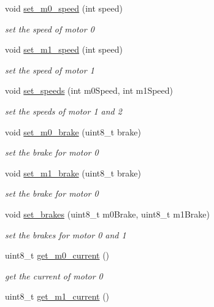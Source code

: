 \begin{DoxyCompactItemize}
\item 
void \hyperlink{class_qik_a6dc1b476ef343bdc6def0f6fd548002a}{set\+\_\+m0\+\_\+speed} (int speed)
\begin{DoxyCompactList}\small\item\em set the speed of motor 0 \end{DoxyCompactList}\item 
void \hyperlink{class_qik_a0973688f7c423dff7cfaa26dab91a126}{set\+\_\+m1\+\_\+speed} (int speed)
\begin{DoxyCompactList}\small\item\em set the speed of motor 1 \end{DoxyCompactList}\item 
void \hyperlink{class_qik_a6d504c59e7eec46da40ad9e71199b6ff}{set\+\_\+speeds} (int m0\+Speed, int m1\+Speed)
\begin{DoxyCompactList}\small\item\em set the speeds of motor 1 and 2 \end{DoxyCompactList}\item 
void \hyperlink{class_qik_a2b2195033a0459df0daec4a01898811a}{set\+\_\+m0\+\_\+brake} (uint8\+\_\+t brake)
\begin{DoxyCompactList}\small\item\em set the brake for motor 0 \end{DoxyCompactList}\item 
void \hyperlink{class_qik_a1795a6acae6aa0f9be0784ff408e5225}{set\+\_\+m1\+\_\+brake} (uint8\+\_\+t brake)
\begin{DoxyCompactList}\small\item\em set the brake for motor 0 \end{DoxyCompactList}\item 
void \hyperlink{class_qik_a0c6762eb5ffe8eaaa12407126caf568c}{set\+\_\+brakes} (uint8\+\_\+t m0\+Brake, uint8\+\_\+t m1\+Brake)
\begin{DoxyCompactList}\small\item\em set the brakes for motor 0 and 1 \end{DoxyCompactList}\item 
uint8\+\_\+t \hyperlink{class_qik_a73e1dfec2256dbe5d8ba2147501bf7d9}{get\+\_\+m0\+\_\+current} ()
\begin{DoxyCompactList}\small\item\em get the current of motor 0 \end{DoxyCompactList}\item 
uint8\+\_\+t \hyperlink{class_qik_a4d786f955b48b2d1a4e866ca6f3b94b8}{get\+\_\+m1\+\_\+current} ()

\end{DoxyCompactItemize}
